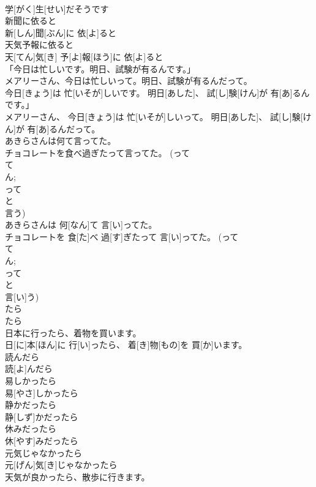 \documentclass[8pt]{extreport}
\begin{document}
\begin{CJK}{UTF8}{min}
\\	学[がく]生[せい]だそうです
\\	新聞に依ると	
\\	新[しん]聞[ぶん]に 依[よ]ると
\\	天気予報に依ると	
\\	天[てん]気[き] 予[よ]報[ほう]に 依[よ]ると
\\	「今日は忙しいです。明日、試験が有るんです。」 
\\	メアリーさん、今日は忙しいって。明日、試験が有るんだって。	
\\	今日[きょう]は 忙[いそが]しいです。 明日[あした]、 試[し]験[けん]が 有[あ]るんです。」 
\\	メアリーさん、 今日[きょう]は 忙[いそが]しいって。 明日[あした]、 試[し]験[けん]が 有[あ]るんだって。
\\	あきらさんは何て言ってた。 
\\	チョコレートを食べ過ぎたって言ってた。 (って 
\\	て 
\\	ん; 
\\	って 
\\	と
\\	言う)	
\\	あきらさんは 何[なん]て 言[い]ってた。 
\\	チョコレートを 食[た]べ 過[す]ぎたって 言[い]ってた。 (って 
\\	て 
\\	ん; 
\\	って 
\\	と
\\	言[い]う)
\\	たら
\\	たら
\\	日本に行ったら、着物を買います。	
\\	日[に]本[ほん]に 行[い]ったら、 着[き]物[もの]を 買[か]います。
\\	読んだら	
\\	読[よ]んだら
\\	易しかったら	
\\	易[やさ]しかったら
\\	静かだったら	
\\	静[しず]かだったら
\\	休みだったら	
\\	休[やす]みだったら
\\	元気じゃなかったら	
\\	元[げん]気[き]じゃなかったら
\\	天気が良かったら、散歩に行きます。	

\end{CJK}
\end{document}
